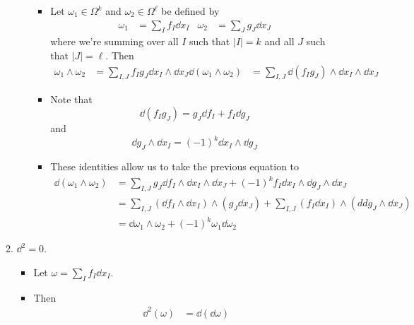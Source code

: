 \documentclass[../notes.tex]{subfiles}
\begin{document}
\begin{itemize}
\begin{enumerate}
\begin{itemize}
            \begin{itemize}
                \item Let $\omega_1\in\Omega^k$ and $\omega_2\in\Omega^\ell$ be defined by
                \begin{align*}
                    \omega_1 &= \sum_If_I\dd{x_I}&
                    \omega_2 &= \sum_Jg_J\dd{x_J}
                \end{align*}
                where we're summing over all $I$ such that $|I|=k$ and all $J$ such that $|J|=\ell$. Then
                \begin{align*}
                    \omega_1\wedge\omega_2 &= \sum_{I,J}f_Ig_J\dd{x_I}\wedge\dd{x_J}
                    \dd{(\omega_1\wedge\omega_2)} &= \sum_{I,J}\dd{(f_Ig_J)}\wedge\dd{x_I}\wedge\dd{x_J}
                \end{align*}
                \item Note that
                \begin{equation*}
                    \dd{(f_Ig_J)} = g_J\dd{f_I}+f_I\dd{g_J}
                \end{equation*}
                and
                \begin{equation*}
                    \dd{g_J}\wedge\dd{x_I} = (-1)^k\dd{x_I}\wedge\dd{g_J}
                \end{equation*}
                \item These identities allow us to take the previous equation to
                \begin{align*}
                    \dd{(\omega_1\wedge\omega_2)} &= \sum_{I,J}g_J\dd{f_I}\wedge\dd{x_I}\wedge\dd{x_J}+(-1)^kf_I\dd{x_I}\wedge\dd{g_J}\wedge\dd{x_J}\\
                    &= \sum_{I,J}(\dd{f_I}\wedge\dd{x_I})\wedge(g_J\dd{x_J})+\sum_{I,J}(f_I\dd{x_I})\wedge(dd{g_J}\wedge\dd{x_J})\\
                    &= \dd{\omega_1}\wedge\omega_2+(-1)^k\omega_1\dd{\omega_2}
                \end{align*}
            \end{itemize}
        \end{itemize}
        \item $\dd^2=0$.
        \begin{itemize}
            \item Let $\omega=\sum_If_I\dd{x_I}$.
            \item Then
            \begin{align*}
                \dd^2(\omega) &= \dd(\dd{\omega})\\

\end{align*}
\end{itemize}
\end{enumerate}
\end{itemize}
\end{document}
